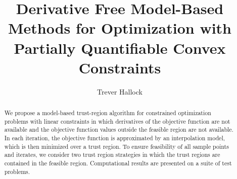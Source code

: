 \documentclass{article}
\title{Derivative Free Model-Based Methods for Optimization with Partially Quantifiable Convex Constraints}
\author{Trever Hallock}
\begin{document}
\maketitle

\begin{abstract}

We propose a model-based trust-region algorithm for constrained optimization problems with linear constraints in which derivatives of the objective function are not available and the objective function values outside the feasible region are not available.
In each iteration, the objective function is approximated by an interpolation model, which is then minimized over a trust region.
To ensure feasibility of all sample points and iterates, we consider two trust region strategies in which the trust regions are contained in the feasible region.
Computational results are presented on a suite of test problems.

\end{abstract}

\newpage

\tableofcontents

\newpage

%







\appendix





\end{document}
